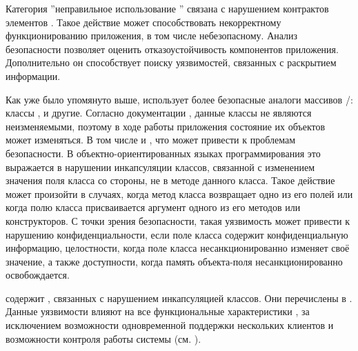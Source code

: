 %
Категория ''неправильное использование '' связана с нарушением контрактов элементов  . 
%
Такое действие может способствовать некорректному функционированию приложения, в том числе небезопасному. 
%
Анализ безопасности   позволяет оценить отказоустойчивость компонентов приложения. 
%
Дополнительно он способствует поиску уязвимостей, связанных с раскрытием информации. 

%
Как уже было упомянуто выше,  использует более безопасные аналоги массивов /: классы ,  и другие. 
%
Согласно документации  , данные классы не являются неизменяемыми, поэтому в ходе работы приложения состояние их объектов может изменяться. 
%
В том числе и , что может привести к проблемам безопасности.
%
В объектно-ориентированных языках программирования это выражается в нарушении инкапсуляции классов, связанной с изменением значения поля класса со стороны, не в методе данного класса.
%
Такое действие может произойти в случаях, когда метод класса возвращает одно из его полей или когда полю класса присваивается аргумент одного из его методов или конструкторов.
%
С точки зрения безопасности, такая уязвимость может привести к нарушению конфиденциальности, если поле класса содержит конфиденциальную информацию, целостности, когда поле класса несанкционированно изменяет своё значение, а также доступности, когда память объекта-поля несанкционированно освобождается. 

%
  содержит , связанных с нарушением инкапсуляцией классов. Они перечислены в . Данные уязвимости влияют на все функциональные характеристики , за исключением возможности одновременной поддержки нескольких клиентов и возможности контроля работы системы (см. ).

